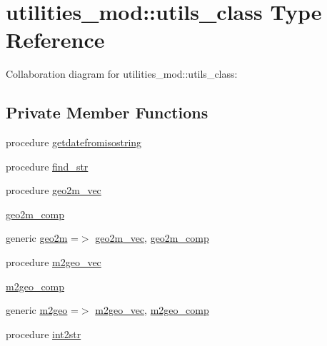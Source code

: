 \hypertarget{structutilities__mod_1_1utils__class}{}\section{utilities\+\_\+mod\+:\+:utils\+\_\+class Type Reference}
\label{structutilities__mod_1_1utils__class}


Collaboration diagram for utilities\+\_\+mod\+:\+:utils\+\_\+class\+:
\subsection*{Private Member Functions}
\begin{DoxyCompactItemize}
\item 
procedure \mbox{\hyperlink{structutilities__mod_1_1utils__class_af2c6e40cca9f6f643105eef0c16f09aa}{getdatefromisostring}}
\item 
procedure \mbox{\hyperlink{structutilities__mod_1_1utils__class_a70fcd702c2e81aaf574c3e031b7b0fef}{find\+\_\+str}}
\item 
procedure \mbox{\hyperlink{structutilities__mod_1_1utils__class_a37ba4d9fc1c6ef99561627f05c82cf7e}{geo2m\+\_\+vec}}
\item 
\mbox{\hyperlink{structutilities__mod_1_1utils__class_ab41bb5a8810e938810f0d08c42c312c9}{geo2m\+\_\+comp}}
\item 
generic \mbox{\hyperlink{structutilities__mod_1_1utils__class_abe6b57e722392dec127bb426c9b0e41f}{geo2m}} =$>$ \mbox{\hyperlink{structutilities__mod_1_1utils__class_a37ba4d9fc1c6ef99561627f05c82cf7e}{geo2m\+\_\+vec}}, \mbox{\hyperlink{structutilities__mod_1_1utils__class_ab41bb5a8810e938810f0d08c42c312c9}{geo2m\+\_\+comp}}
\item 
procedure \mbox{\hyperlink{structutilities__mod_1_1utils__class_a8319bf9d14dd225be0f30f5e0c1f04e3}{m2geo\+\_\+vec}}
\item 
\mbox{\hyperlink{structutilities__mod_1_1utils__class_a8cceeee65240f821428cd4dc65fd5fa0}{m2geo\+\_\+comp}}
\item 
generic \mbox{\hyperlink{structutilities__mod_1_1utils__class_a345230eb5aac79b78603538f0fd0e36e}{m2geo}} =$>$ \mbox{\hyperlink{structutilities__mod_1_1utils__class_a8319bf9d14dd225be0f30f5e0c1f04e3}{m2geo\+\_\+vec}}, \mbox{\hyperlink{structutilities__mod_1_1utils__class_a8cceeee65240f821428cd4dc65fd5fa0}{m2geo\+\_\+comp}}
\item 
procedure \mbox{\hyperlink{structutilities__mod_1_1utils__class_ae3a7fea394d64f5f4592504841b07777}{int2str}}

\end{DoxyCompactItemize}
